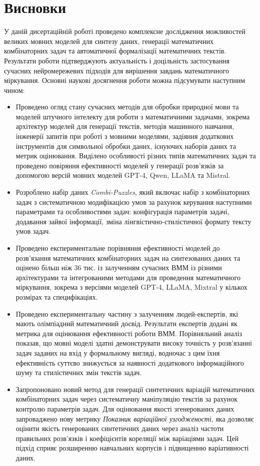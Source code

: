 \chapter*{Висновки}

У даній дисертаційній роботі проведено комплексне дослідження можливостей великих мовних моделей для синтезу даних, генерації математичних комбінаторних задач та автоматичної формалізації математичних текстів. Результати роботи підтверджують актуальність і доцільність застосування сучасних нейромережевих підходів для вирішення завдань математичного міркування. Основні наукові досягнення роботи можна підсумувати наступним чином:
\begin{itemize}
    \item Проведено огляд стану сучасних методів для обробки природної мови та моделей штучного інтелекту для роботи з математичними задачами, зокрема архітектур моделей для генерації текстів, методів машинного навчання, інженерії запитів при роботі з мовними моделями, задіяння додаткових інструментів для символьної обробки даних, існуючих наборів даних та метрик оцінювання. Виділено особливості різних типів математичних задач та проведено повіряння ефективності моделей у генерації розв'язків за допомогою версій мовних моделей GPT-4, Qwen, LLaMA та Mistral.
    \item Розроблено набір даних \emph{Combi-Puzzles}, який включає набір з комбінаторних задач з систематичною модифікацією умов за рахунок керування наступними параметрами та особливостями задач: конфігурація параметрів задачі, додавання зайвої інформації, зміна лінгвістично-стилістичної формату тексту умов задач.
    \item Проведено експериментальне порівняння ефективності моделей до розв'язання математичних комбінаторних задач на синтезованих даних та оцінено більш ніж 36 тис. із залученням сучасних ВММ із різними архітектурами та інтегрованими методами для проведення математичного міркування, зокрема з версіями моделей GPT-4, LLaMA, Mixtral у кількох розмірах та специфікаціях.
    \item Проведено експериментальну частину з залученням людей-експертів, які мають олімпіадний математичний досвід. Результати експертів додані як метрика для оцінювання ефективності роботи ВММ. Порівняльний аналіз показав, що мовні моделі здатні демонструвати високу точність у розв'язанні задач заданих на вхід у формальному вигляді, водночас з цим їхня ефективність суттєво знижується за наявності додаткового інформаційного шуму та стилістичних змін текстів задач.
    \item Запропоновано новий метод для генерації синтетичних варіацій математичних комбінаторних задач через систематичну маніпуляцію текстів за рахунок контролю параметрів задач. Для оцінювання якості згенерованих даних запроваджено нову метрику \emph{Показник варіаційної узгодженості}, яка дозволяє оцінити якість генерованих синтетичних даних через аналіз частоти правильних розв'язків і коефіцієнтів кореляції між варіаціями задач. Цей підхід сприяє розширенню навчальних корпусів і підвищенню варіативності даних.
\end{itemize}

